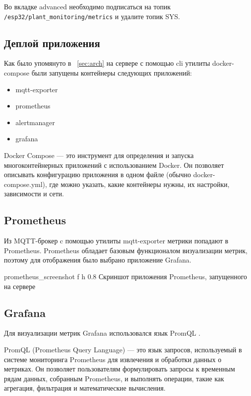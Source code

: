 \documentclass{bmstu}
\begin{document}
    Во вкладке advanced необходимо подписаться на топик \texttt{/esp32/plant\_monitoring/metrics} и удалите топик SYS.

    \subsection{Деплой приложения}

    Как было упомянуто в ~\ref{sec:arch} на сервере с помощью cli утилиты docker-compose были запущены контейнеры следующих приложений:
    \begin{itemize}
        \item mqtt-exporter
        \item prometheus
        \item alertmanager
        \item grafana
    \end{itemize}

    Docker Compose — это инструмент для определения и запуска многоконтейнерных приложений с использованием Docker.
    Он позволяет описывать конфигурацию приложения в одном файле (обычно docker-compose.yml), где можно указать,
    какие контейнеры нужны, их настройки, зависимости и сети.

    \subsection{Prometheus}
    Из MQTT-брокер c помощью утилиты mqtt-exporter метрики попадают в Prometheus.
    Prometheus обладает базовым функционалом визуализации метрик, поэтому для отображения было выбрано приложение Grafana.

        {prometheus_screenshot}
        {f}
        {h}
        {0.8\textwidth}
        {Скриншот приложения Prometheus, запущенного на сервере}


    \subsection{Grafana}

    Для визуализации метрик Grafana использовался язык PromQL \cite{styopaChtoTakoePromQL2023}.

    PromQL (Prometheus Query Language) — это язык запросов, используемый в системе мониторинга Prometheus для извлечения
    и обработки данных о метриках.
    Он позволяет пользователям формулировать запросы к временным рядам данных, собранным Prometheus,
    и выполнять операции, такие как агрегация, фильтрация и математические вычисления.
\end{document}

